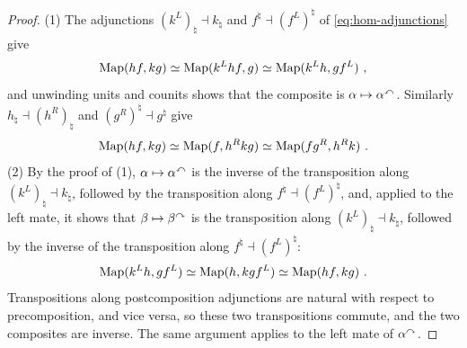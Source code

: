 \begin{proof}
%
(1) The adjunctions
$(k^{L})_{\natural} \dashv k_{\natural}$
and
$f^{\natural} \dashv (f^{L})^{\natural}$
of \eqref{eq:hom-adjunctions} give
\begin{equation*}
\operatorname{Map}(hf,kg) \simeq \operatorname{Map}(k^{L}hf,g) \simeq \operatorname{Map}(k^{L}h,gf^{L}) \ ,
\end{equation*}
and unwinding units and counits shows that the composite is
$\alpha \mapsto {\alpha}^{\curvearrowleft}$.
Similarly
$h_{\natural} \dashv (h^{R})_{\natural}$
and
$(g^{R})^{\natural} \dashv g^{\natural}$
give
\begin{equation*}
\operatorname{Map}(hf,kg) \simeq \operatorname{Map}(f,h^{R}kg) \simeq \operatorname{Map}(fg^{R},h^{R}k) \ .
\end{equation*}
(2) By the proof of (1),
$\alpha \mapsto {\alpha}^{\curvearrowleft}$
is the inverse of the transposition along
$(k^{L})_{\natural} \dashv k_{\natural}$,
followed by the transposition along
$f^{\natural} \dashv (f^{L})^{\natural}$,
and, applied to the left mate, it shows that
$\beta \mapsto {\beta}^{\curvearrowright}$
is the transposition along
$(k^{L})_{\natural} \dashv k_{\natural}$,
followed by the inverse of the transposition along
$f^{\natural} \dashv (f^{L})^{\natural}$:
\begin{equation*}
\operatorname{Map}(k^{L}h,gf^{L}) \simeq \operatorname{Map}(h,kgf^{L}) \simeq \operatorname{Map}(hf,kg) \ .
\end{equation*}
Transpositions along postcomposition adjunctions are natural with respect to
precomposition, and vice versa, so these two transpositions commute, and the
two composites are inverse. The same argument applies to the left mate of
${\alpha}^{\curvearrowright}$.


\end{proof}
